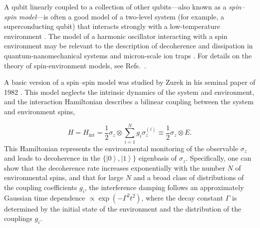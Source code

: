 \documentclass[3p,sort&compress,12pt]{elsarticle}
\newcommand{\ket}[1]{\left\vert{#1}\right\rangle}
\newcommand{\op}[1]{#1}
\begin{document}
A qubit linearly coupled to a collection of other qubits---also known as a \emph{spin--spin model}---is often a good model of a two-level system (for example, a superconducting qubit) that interacts strongly with a low-temperature environment \cite{Prokofev:2000:zz,Dube:2001:zz}. The model of a harmonic oscillator interacting with a spin environment may be relevant to the description of decoherence and dissipation in quantum-nanomechanical systems and micron-scale ion traps \cite{Schlosshauer:2008:os}. For details on the theory of spin-environment models, see Refs.~\cite{Dube:2001:zz,Stamp:1998:im,Prokofev:1995:ab,Prokofev:1993:aa}.

A basic version of a spin--spin model was studied by Zurek in his seminal paper of 1982 \cite{Zurek:1982:tv}. This model neglects the intrinsic dynamics of the system and environment, and the interaction Hamiltonian describes a bilinear coupling between the system and environment spins, 

%
\begin{equation}\label{eq:hse-zurek}
  \op{H} = \op{H}_\text{int} = \frac{1}{2} \op{\sigma}_z \otimes
   \sum_{i=1}^N g_i \op{\sigma}^{(i)}_z  \equiv
  \frac{1}{2} \op{\sigma}_z \otimes \op{E}.
\end{equation}
%
This Hamiltonian represents the environmental monitoring of the observable $\sigma_z$ and leads to decoherence in the $\{\ket{0},\ket{1}\}$ eigenbasis of $\op{\sigma}_z$. Specifically, one can show \cite{Zurek:1982:tv,Cucchietti:2005:om} that the decoherence rate increases exponentially with the number $N$ of environmental spins, and that for large $N$ and a broad class of distributions of the coupling coefficients $g_i$, the interference damping follows an approximately Gaussian time dependence
$\propto \exp(- \Gamma^2 t^2)$, where the decay constant $\Gamma$ is determined by the initial state of the environment and the distribution of the couplings $g_i$. 
\end{document}
